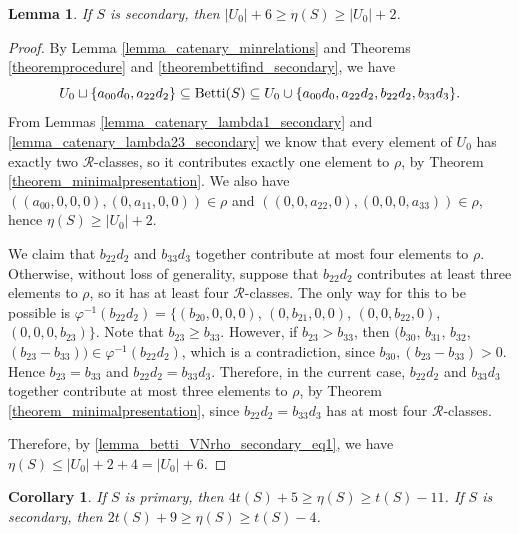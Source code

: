 \documentclass[12pt]{article}
\newtheorem{lemma}[thm]{Lemma}
\newtheorem{cor}[thm]{Corollary}
\theoremstyle{remark}
\begin{document}
\begin{lemma}\label{lemma_betti_VNrho_secondary}
    If $S$ is secondary, then $|U_0| + 6 \geq  \eta(S) \geq |U_0| + 2 $. 
\end{lemma}
\begin{proof}
    By Lemma \ref{lemma_catenary_minrelations} and Theorems \ref{theoremprocedure} and \ref{theorembettifind_secondary}, we have
   \begin{equation}\label{lemma_betti_VNrho_secondary_eq1}
        U_0 \sqcup \{a_{00}d_0, a_{22}d_2\} \subseteq \textup{Betti}(S) \subseteq U_0 \cup \{a_{00}d_0, a_{22}d_2, b_{22}d_2, b_{33}d_3\}. 
    \end{equation}
     From Lemmas \ref{lemma_catenary_lambda1_secondary} and \ref{lemma_catenary_lambda23_secondary} we know that every element of $U_0$ has exactly two $\mathcal{R}$-classes, so it contributes exactly one element to $\rho$, by Theorem \ref{theorem_minimalpresentation}. We also have $((a_{00},0,0,0),(0,a_{11},0,0) ) \in \rho$ and $((0,0,a_{22},0),(0,0,0,a_{33})) \in  \rho$, hence $\eta(S) \geq |U_0| + 2$.

     We claim that $b_{22}d_2$ and $b_{33}d_3$ together contribute at most four elements to $\rho$. Otherwise, without loss of generality, suppose that $b_{22}d_2$ contributes at least three elements to $\rho$, so it has at least four $\mathcal{R}$-classes. The only way for this to be possible is $\varphi^{-1}(b_{22}d_2) = \{(b_{20},0,0,0)$, $(0,b_{21},0,0)$, $(0,0,b_{22},0)$, $(0,0,0,b_{23})\}$. Note that $b_{23} \geq b_{33}$. However, if $b_{23} > b_{33}$, then $(b_{30}$, $b_{31}$, $b_{32}$, $(b_{23}-b_{33})) \in \varphi^{-1}(b_{22}d_2)$, which is a contradiction, since $b_{30}, (b_{23}-b_{33}) > 0 $. Hence $b_{23}=b_{33}$ and $b_{22}d_2 = b_{33}d_3$. Therefore, in the current case, $b_{22}d_2$ and $b_{33}d_3$ together contribute at most three elements to $\rho$, by Theorem \ref{theorem_minimalpresentation}, since $b_{22}d_2 = b_{33}d_3$ has at most four $\mathcal{R}$-classes. 
     
     
    Therefore, by \eqref{lemma_betti_VNrho_secondary_eq1}, we have $\eta(S) \leq |U_0| + 2 + 4 = |U_0| + 6$.   
\end{proof}







\begin{cor}\label{corollary_type_main}
     If $S$ is primary, then $4 t(S) +5 \geq \eta(S) \geq t(S) - 11$.  If $S$ is secondary, then $2 t(S) +9 \geq \eta(S) \geq t(S) - 4$. 
\end{cor}
\end{document}
